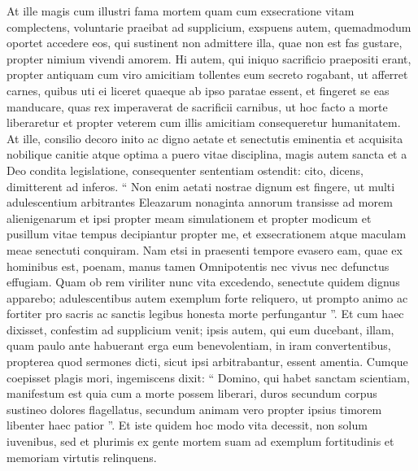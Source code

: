 \begin{biblechapter}
\begin{biblechapter}
\begin{biblechapter}
\begin{biblechapter}
\begin{biblechapter}
\begin{biblechapter}
 \verse At ille magis cum illustri fama mortem quam cum exsecratione vitam complectens, voluntarie praeibat ad supplicium, 
\verse exspuens autem, quemadmodum oportet accedere eos, qui sustinent non admittere illa, quae non est fas gustare, propter nimium vivendi amorem. 
\verse Hi autem, qui iniquo sacrificio praepositi erant, propter antiquam cum viro amicitiam tollentes eum secreto rogabant, ut afferret carnes, quibus uti ei liceret quaeque ab ipso paratae essent, et fingeret se eas manducare, quas rex imperaverat de sacrificii carnibus, 
\verse ut hoc facto a morte liberaretur et propter veterem cum illis amicitiam consequeretur humanitatem. 
\verse At ille, consilio decoro inito ac digno aetate et senectutis eminentia et acquisita nobilique canitie atque optima a puero vitae disciplina, magis autem sancta et a Deo condita legislatione, consequenter sententiam ostendit: cito, dicens, dimitterent ad inferos. 
\verse “ Non enim aetati nostrae dignum est fingere, ut multi adulescentium arbitrantes Eleazarum nonaginta annorum transisse ad morem alienigenarum 
\verse et ipsi propter meam simulationem et propter modicum et pusillum vitae tempus decipiantur propter me, et exsecrationem atque maculam meae senectuti conquiram. 
 \verse Nam etsi in praesenti tempore evasero eam, quae ex hominibus est, poenam, manus tamen Omnipotentis nec vivus nec defunctus effugiam. 
\verse Quam ob rem viriliter nunc vita excedendo, senectute quidem dignus apparebo; 
\verse adulescentibus autem exemplum forte reliquero, ut prompto animo ac fortiter pro sacris ac sanctis legibus honesta morte perfungantur ”. Et cum haec dixisset, confestim ad supplicium venit; 
\verse ipsis autem, qui eum ducebant, illam, quam paulo ante habuerant erga eum benevolentiam, in iram convertentibus, propterea quod sermones dicti, sicut ipsi arbitrabantur, essent amentia. 
\verse Cumque coepisset plagis mori, ingemiscens dixit: “ Domino, qui habet sanctam scientiam, manifestum est quia cum a morte possem liberari, duros secundum corpus sustineo dolores flagellatus, secundum animam vero propter ipsius timorem libenter haec patior ”. 
\verse Et iste quidem hoc modo vita decessit, non solum iuvenibus, sed et plurimis ex gente mortem suam ad exemplum fortitudinis et memoriam virtutis relinquens.
 

\end{biblechapter}
\end{biblechapter}
\end{biblechapter}
\end{biblechapter}
\end{biblechapter}
\end{biblechapter}
